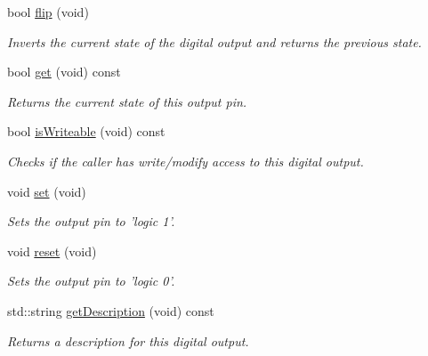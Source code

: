 \begin{DoxyCompactItemize}
\item 
bool \hyperlink{classmv_i_m_p_a_c_t_1_1acquire_1_1_digital_output_a67cf42fcef76587e859c5cf53d4652db}{flip} (void)
\begin{DoxyCompactList}\small\item\em Inverts the current state of the digital output and returns the previous state. \end{DoxyCompactList}\item 
bool \hyperlink{classmv_i_m_p_a_c_t_1_1acquire_1_1_digital_output_a9282bfba2482425bbe09feca682d1ed8}{get} (void) const 
\begin{DoxyCompactList}\small\item\em Returns the current state of this output pin. \end{DoxyCompactList}\item 
bool \hyperlink{classmv_i_m_p_a_c_t_1_1acquire_1_1_digital_output_ad31d273043705b1d36e1b1f678128148}{is\+Writeable} (void) const 
\begin{DoxyCompactList}\small\item\em Checks if the caller has write/modify access to this digital output. \end{DoxyCompactList}\item 
\hypertarget{classmv_i_m_p_a_c_t_1_1acquire_1_1_digital_output_aad8f86e2e64cff6044cac0bbb2a460fd}{void \hyperlink{classmv_i_m_p_a_c_t_1_1acquire_1_1_digital_output_aad8f86e2e64cff6044cac0bbb2a460fd}{set} (void)}\label{classmv_i_m_p_a_c_t_1_1acquire_1_1_digital_output_aad8f86e2e64cff6044cac0bbb2a460fd}

\begin{DoxyCompactList}\small\item\em Sets the output pin to 'logic 1'. \end{DoxyCompactList}\item 
\hypertarget{classmv_i_m_p_a_c_t_1_1acquire_1_1_digital_output_a4d813a511b663ee99f141c22473ff6db}{void \hyperlink{classmv_i_m_p_a_c_t_1_1acquire_1_1_digital_output_a4d813a511b663ee99f141c22473ff6db}{reset} (void)}\label{classmv_i_m_p_a_c_t_1_1acquire_1_1_digital_output_a4d813a511b663ee99f141c22473ff6db}

\begin{DoxyCompactList}\small\item\em Sets the output pin to 'logic 0'. \end{DoxyCompactList}\item 
std\+::string \hyperlink{classmv_i_m_p_a_c_t_1_1acquire_1_1_digital_output_a7f77527bd1234158b833ceb49e639a87}{get\+Description} (void) const 
\begin{DoxyCompactList}\small\item\em Returns a description for this digital output. \end{DoxyCompactList}\end{DoxyCompactItemize}
